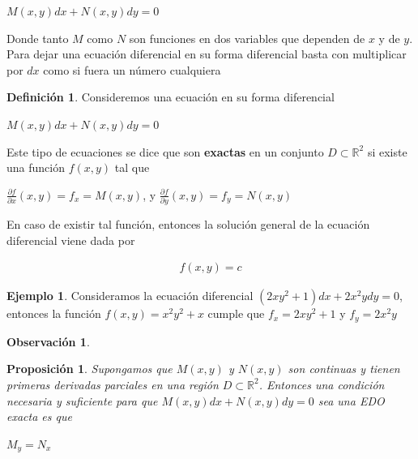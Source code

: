 \documentclass{article}
\theoremstyle{plain}
\newtheorem{prop}[thm]{Proposición}
\theoremstyle{definition}
\newtheorem{defin}[thm]{Definición}
\newtheorem{ejem}[thm]{Ejemplo}
\newtheorem{rmk}[thm]{Observación}
\begin{document}
\begin{center}
$M(x,y) dx +N(x,y)dy=0$
\end{center}

Donde tanto $ M$ como $N$ son funciones en dos variables que dependen de $x$ y de $y$. Para dejar una ecuación diferencial en su forma diferencial basta con multiplicar por $dx$ como si fuera un número cualquiera\\


\begin{defin}Consideremos una ecuación  en su forma diferencial
\end{defin}

\begin{center}
$M(x,y) dx +N(x,y)dy=0$
\end{center}

Este tipo de ecuaciones se dice que son \textbf{exactas} en un conjunto $D \subset \mathbb{R}^2$ si existe una función $f(x,y)$ tal que

\begin{center}
$\displaystyle \frac{\partial f}{\partial x} (x,y) = f_x = M(x,y)$, y $\displaystyle \frac{\partial f}{\partial y} (x,y) = f_y = N(x,y)$
\end{center}

En caso de existir tal función, entonces la solución general de la ecuación diferencial viene dada por

\begin{align*}
    f(x,y) = c
\end{align*}


\begin{ejem}Consideramos la ecuación diferencial $(2xy^2+1)dx + 2x^2ydy=0	$, entonces la función  $f(x,y)=x^2y^2+x$ cumple que $f_x= 2xy^2+1$ y $f_y= 2x^2y$ \\
\end{ejem}




\begin{rmk}\\
\end{rmk}

\begin{prop}Supongamos que $M(x,y)$ y $N(x,y)$ son continuas y tienen primeras derivadas parciales en una región $D \subset \mathbb{R}^2$. Entonces una condición necesaria y suficiente para que $M(x,y)dx+N(x,y)dy=0$ sea una EDO exacta es que
\end{prop}

\begin{center}
$M_y =N_x$
\end{center}
\end{document}
